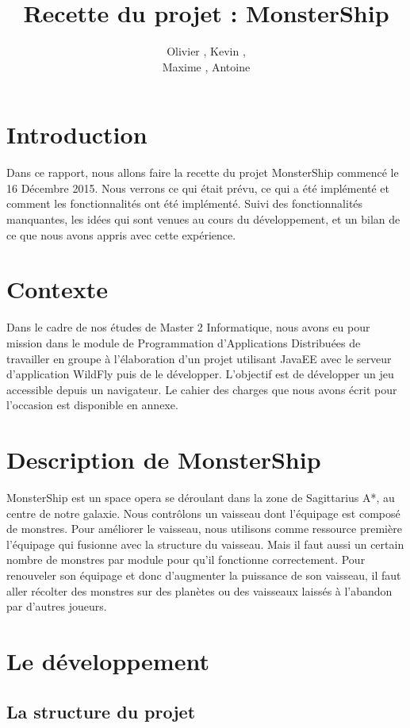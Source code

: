 \documentclass[a4paper,11pt]{report}
\title{Recette du projet : MonsterShip}
\author{Olivier \bsc{Boissard}, Kevin \bsc{Boulala},\\Maxime \bsc{Dubois}, Antoine \bsc{Lavier}}
\begin{document}
\maketitle
\setcounter{tocdepth}{1}
\tableofcontents

\chapter{Introduction}
  Dans ce rapport, nous allons faire la recette du projet MonsterShip commencé le 16 Décembre 2015. Nous verrons ce qui était prévu, ce qui a été implémenté et comment les fonctionnalités ont été implémenté. Suivi des fonctionnalités manquantes, les idées qui sont venues au cours du développement, et un bilan de ce que nous avons appris avec cette expérience.
  
\chapter{Contexte}
  Dans le cadre de nos études de Master 2 Informatique, nous avons eu pour mission dans le module de Programmation d'Applications Distribuées de travailler en groupe à l'élaboration d'un projet utilisant JavaEE avec le serveur d'application WildFly puis de le développer. L'objectif est de développer un jeu accessible depuis un navigateur. Le cahier des charges que nous avons écrit pour l'occasion est disponible en annexe.

\chapter{Description de MonsterShip}
  MonsterShip est un space opera se déroulant dans la zone de Sagittarius A*, au centre de notre galaxie. Nous contrôlons un vaisseau dont l'équipage est composé de monstres. Pour améliorer le vaisseau, nous utilisons comme ressource première l'équipage qui fusionne avec la structure du vaisseau. Mais il faut aussi un certain nombre de monstres par module pour qu'il fonctionne correctement. Pour renouveler son équipage et donc d'augmenter la puissance de son vaisseau, il faut aller récolter des monstres sur des planètes ou des vaisseaux laissés à l'abandon par d'autres joueurs.

\chapter{Le développement}

  \section{La structure du projet}
\end{document}
